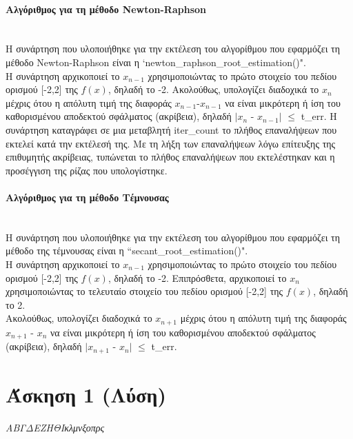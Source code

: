 \documentclass[a4paper,11pt]{article}
\newcommand{\lt}{\latintext}
\begin{document}
		\paragraph{Αλγόριθμος για τη μέθοδο {\lt Newton-Raphson }}\mbox{}\\
			Η συνάρτηση που υλοποιήθηκε για την εκτέλεση του αλγορίθμου που εφαρμόζει τη μέθοδο {\lt Newton-Raphson } είναι η {\lt `newton\_raphson\_root\_estimation()"}.\\
			Η συνάρτηση αρχικοποιεί το {$x_{n-1}$} χρησιμοποιώντας το πρώτο στοιχείο του πεδίου ορισμού [-2,2] της {\lt $f(x)$}, δηλαδή το -2. Ακολούθως, υπολογίζει διαδοχικά το  {$x_{n}$} μέχρις ότου
			η απόλυτη τιμή της διαφοράς {$x_{n-1}$}-{$x_{n-1}$} να είναι μικρότερη ή ίση του καθορισμένου αποδεκτού σφάλματος (ακρίβεια), δηλαδή $|${$x_{n}$} - {$x_{n-1}$}$|$ {$\leq$} {\lt t\_err}. Η συνάρτηση καταγράφει σε 					μια μεταβλητή {\lt iter\_count} το πλήθος επαναλήψεων που εκτελεί κατά την εκτέλεσή της. Με τη λήξη των επαναλήψεων λόγω επίτευξης της επιθυμητής ακρίβειας, τυπώνεται το πλήθος επαναλήψεων που 							εκτελέστηκαν και η προσέγγιση της ρίζας που υπολογίστηκε.
		\paragraph{Αλγόριθμος για τη μέθοδο Τέμνουσας}\mbox{} \\
			Η συνάρτηση που υλοποιήθηκε για την εκτέλεση του αλγορίθμου που εφαρμόζει τη μέθοδο της τέμνουσας είναι η {\lt ``secant\_root\_estimation()"}. \\
			Η συνάρτηση αρχικοποιεί το {$x_{n-1}$} χρησιμοποιώντας το πρώτο στοιχείο του πεδίου ορισμού [-2,2] της {\lt $f(x)$}, δηλαδή το -2. Επιπρόσθετα, αρχικοποιεί το {$x_{n}$} χρησιμοποιώντας το τελευταίο στοιχείο του 					πεδίου ορισμού [-2,2] της {\lt $f(x)$}, δηλαδή το 2.\\
			Ακολούθως, υπολογίζει διαδοχικά το {$x_{n+1}$} μέχρις ότου η απόλυτη τιμή της διαφοράς {$x_{n+1}$} - {$x_{n}$} να είναι μικρότερη ή ίση του καθορισμένου αποδεκτού σφάλματος (ακρίβεια), δηλαδή 
			$|${$x_{n+1}$} - {$x_{n}$}$|$ {$\leq$} {\lt t\_err}.
			
			
		

\section{Άσκηση 1 (Λύση)}
	
	\begin{center}
		\emph{{\tiny Α}{\scriptsize Β}{\footnotesize Γ}{\small Δ}{\normalsize Ε}{\large Ζ}{\Large Η}{\LARGE Θ}{\huge Ι}{\huge κ}{\LARGE λ}{\Large μ}{\large ν}{\normalsize ξ}{\small ο}{\footnotesize π}{\scriptsize ρ}{\tiny ς}}
	\end{center}
\end{document}
